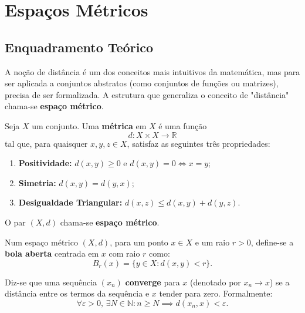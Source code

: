 
\section{Espaços Métricos}

\subsection{Enquadramento Teórico}

A noção de distância é um dos conceitos mais intuitivos da matemática, mas para ser aplicada a conjuntos abstratos (como conjuntos de funções ou matrizes), precisa de ser formalizada. A estrutura que generaliza o conceito de "distância" chama-se \textbf{espaço métrico}.

\begin{defbox}[title={Métrica e Espaço Métrico}]
  Seja $X$ um conjunto. Uma \textbf{métrica} em $X$ é uma função
  \[
    d: X \times X \to \mathbb{R}
  \]
  tal que, para quaisquer $x,y,z \in X$, satisfaz as seguintes três propriedades:
  \begin{enumerate}[label=(\roman*)]
      \item \textbf{Positividade:} $d(x,y) \ge 0$ e $d(x,y)=0 \iff x=y$;
      \item \textbf{Simetria:} $d(x,y) = d(y,x)$;
      \item \textbf{Desigualdade Triangular:} $d(x,z) \le d(x,y) + d(y,z)$.
  \end{enumerate}
  O par $(X,d)$ chama-se \textbf{espaço métrico}.
\end{defbox}

\begin{defbox}[title={Bolas Abertas e Convergência}]
  Num espaço métrico $(X,d)$, para um ponto $x\in X$ e um raio $r>0$, define-se a \textbf{bola aberta} centrada em $x$ com raio $r$ como:
  \[
    B_r(x) = \{y\in X : d(x,y)<r\}.
  \]

  Diz-se que uma sequência $(x_n)$ \textbf{converge} para $x$ (denotado por $x_n \to x$) se a distância entre os termos da sequência e $x$ tender para zero. Formalmente:
  \[
    \forall \varepsilon > 0, \, \exists N\in\mathbb{N} : n\ge N \implies d(x_n,x) < \varepsilon.
  \]
\end{defbox}


